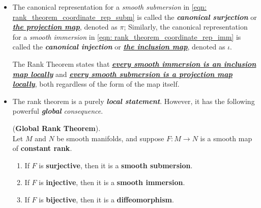 \documentclass[11pt]{article}
\begin{document}
\begin{itemize}
\item \begin{remark}
The canonical representation for a \emph{smooth submersion} in \eqref{eqn: rank_theorem_coordinate_rep_subm} is called the \emph{\textbf{canonical surjection}} or  \underline{\emph{\textbf{the projection map}}}, denoted as $\pi$;  Similarly, the canonical representation for a \emph{smooth immersion} in \eqref{eqn: rank_theorem_coordinate_rep_imm} is called the  \emph{\textbf{canonical injection}} or \underline{\emph{\textbf{the inclusion map}}}, denoted as $\iota$.

The Rank Theorem states that \underline{\emph{\textbf{every smooth immersion is an inclusion map locally}}} and \underline{\emph{\textbf{every smooth submersion is a projection map locally}}}, both regardless of the form of the map itself.
\end{remark}

\item The rank theorem is a purely \emph{\textbf{local statement}}. However, it has the following powerful \emph{\textbf{global} consequence}.
\begin{theorem} (\textbf{Global Rank Theorem}). \citep{lee2003introduction}\\
Let $M$ and $N$ be smooth manifolds, and suppose $F: M \rightarrow N$ is a smooth map of \textbf{constant rank}.
\begin{enumerate}
\item If $F$ is \textbf{surjective}, then it is a \textbf{smooth submersion}.
\item If $F$ is \textbf{injective}, then it is a \textbf{smooth immersion}.
\item If $F$ is \textbf{bijective}, then it is a \textbf{diffeomorphism}.
\end{enumerate}
\end{theorem}
\end{itemize}
\end{document}
